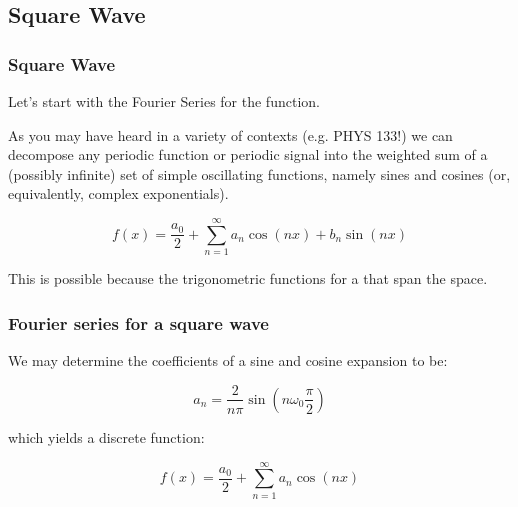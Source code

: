 \documentclass[hyperref={colorlinks=true}]{beamer}
\begin{document}
\subsection[Square Wave]{Square Wave}

\begin{frame}%
  \frametitle{Square Wave}

  Let's start with the Fourier Series for the  function.
  
  \mysp
  
  As you may have heard in a variety of contexts (e.g. PHYS 133!) we can decompose any periodic function or periodic signal into the weighted sum of a (possibly infinite) set of simple oscillating functions, namely sines and cosines (or, equivalently, complex exponentials). 

  \begin{equation}
    f(x) = \frac{a_0}{2} + \sum_{n=1}^{\infty} a_n \cos(nx) + b_n \sin(nx)
  \end{equation}

This is possible because the trigonometric functions for a  that span the space.

  \mysp

  \centering {}


\end{frame}
  

\begin{frame}
  \frametitle{Fourier series for a square wave}
    
  We may determine the coefficients of a sine and cosine expansion to be:
  
  \begin{equation}
    a_n =\frac{2}{n\pi}\sin \left(n \omega_0 \frac{\pi}{2} \right)
  \end{equation}
  
  which yields a discrete function:
  
  \begin{equation}
    f(x) = \frac{a_0}{2} + \sum_{n=1}^{\infty} a_n \cos(nx) 
  \end{equation}
  
  \centering {}

\end{frame}
\end{document}
